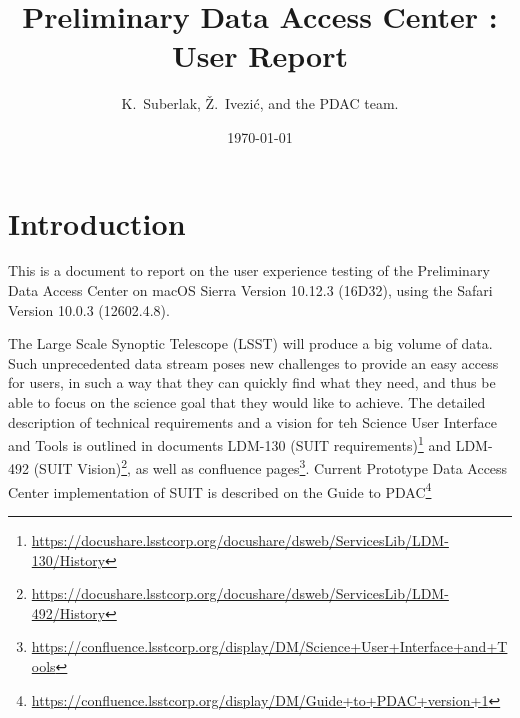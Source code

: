 \documentclass[DM,lsstdraft,toc,usenatbib]{lsstdoc}
\title[PDAC report]{Preliminary Data Access Center : User Report}
\author{
K.~Suberlak,
\v{Z}.~Ivezi\'c,
and the PDAC team.}
\date{\today}
\begin{document}
\maketitle

\section{Introduction}

This is a document to report on the user experience testing of the Preliminary Data Access Center  on  macOS Sierra Version 10.12.3 (16D32), using the Safari Version 10.0.3 (12602.4.8).

 The Large Scale Synoptic Telescope (LSST) will produce a big volume of data. Such unprecedented data stream poses new challenges  to provide an easy access for users, in such a way that they can quickly find what they need, and thus be able to focus on the science goal that they would like to achieve.  The detailed description of  technical requirements and a vision for teh Science User Interface and Tools is outlined in documents LDM-130 (SUIT requirements)\footnote{\url{https://docushare.lsstcorp.org/docushare/dsweb/ServicesLib/LDM-130/History}}  and LDM-492  (SUIT Vision)\footnote{\url{https://docushare.lsstcorp.org/docushare/dsweb/ServicesLib/LDM-492/History}}, as well as confluence pages\footnote{\url{https://confluence.lsstcorp.org/display/DM/Science+User+Interface+and+Tools}}. Current Prototype Data Access Center implementation of SUIT is described on the Guide to PDAC\footnote{\url{https://confluence.lsstcorp.org/display/DM/Guide+to+PDAC+version+1}\label{note1}}
\end{document}
